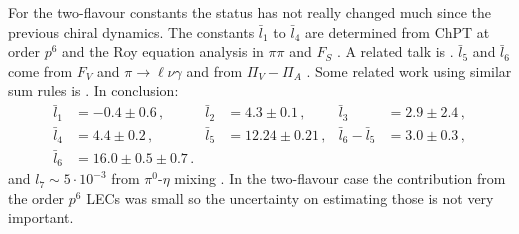 \documentclass[cits,hyper]{PoS}
\begin{document}
For the two-flavour constants the status has not really changed much since
the previous chiral dynamics.
The constants $\bar l_1$ to $\bar l_4$
are determined from ChPT at order $p^6$ and the Roy equation analysis
in $\pi\pi$ and $F_S$ \cite{CGL}. A related talk is \cite{Rios}.
$\bar l_5$
and $\bar l_6$ come from $F_V$ and $\pi\to\ell\nu\gamma$
\cite{BCT,BT}
and from $\Pi_V-\Pi_A$ \cite{GPP}.
Some related work using similar sum rules is \cite{Dominguez}.
In conclusion:
\begin{align}
\label{valueli}
\bar l_1&=-0.4\pm 0.6\,,&
\bar l_2&= 4.3\pm0.1\,,&
\bar l_3&=2.9\pm2.4\,,
\nonumber\\
\bar l_4&=4.4\pm0.2\,,&
\bar l_5 &= 12.24\pm0.21\,,&
\bar l_6-\bar l_5& = 3.0\pm0.3\,,
\nonumber\\
\bar l_6 &= 16.0\pm0.5\pm0.7\,.
\nonumber
\end{align}
and $l_7\sim 5\cdot 10^{-3}$
from $\pi^0$-$\eta$ mixing \cite{GL1}.
In the two-flavour case the contribution from the order $p^6$ LECs was small
so the uncertainty on estimating those is not very important.
\end{document}
